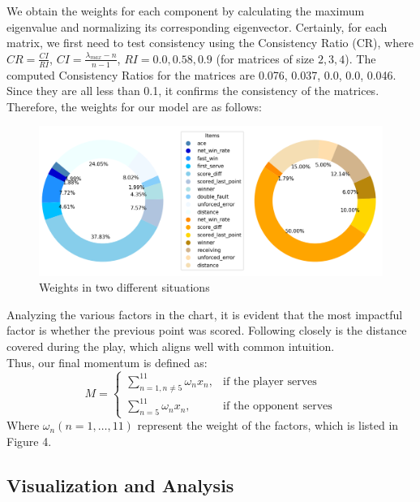 We obtain the weights for each component by calculating the maximum eigenvalue and normalizing 
its corresponding eigenvector. Certainly, for each matrix, we first need to test consistency 
using the Consistency Ratio (CR), where \(CR=\frac{CI}{RI}\), \(CI=\frac{\lambda_{max}-n}{n-1}\), 
\(RI=0.0, 0.58, 0.9\) (for matrices of size \(2, 3, 4\)). The computed Consistency Ratios for the 
matrices are 0.076, 0.037, 0.0, 0.0, 0.046. Since they are all less than 0.1, it confirms the 
consistency of the matrices.\\

\indent Therefore, the weights for our model are as follows:


\begin{figure}[H]
    \centering
    \includegraphics[scale=0.65]{mainmatter/imgs/7.png}
    \caption{Weights in two different situations}
\end{figure}

Analyzing the various factors in the chart, it is evident that the most impactful factor is 
whether the previous point was scored. Following closely is the distance covered during the 
play, which aligns well with common intuition.\\

Thus, our final momentum is defined as:
$$M=\begin{cases}
    \sum\limits_{n=1,n\neq 5}^{11}\omega_n x_n, & \text{if the player serves}  \\
    \sum\limits_{n=5}^{11}\omega_n x_n, & \text{if the opponent serves}
\end{cases}$$
Where $\omega_n(n=1,\dots,11)$ represent the weight of the factors, which is listed in Figure 4.\\

\subsection{Visualization and Analysis}~{}

